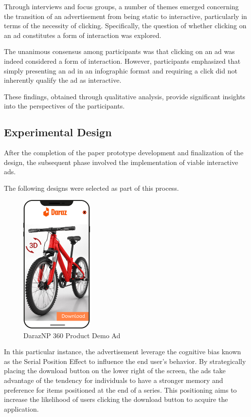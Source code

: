 \documentclass[journal]{IEEEtran}
\begin{document}
Through interviews and focus groups, a number of themes emerged concerning the transition
of an advertisement from being static to interactive, particularly in terms of the necessity
of clicking. Specifically, the question of whether clicking on an ad constitutes a form of
interaction was explored.

The unanimous consensus among participants was that clicking on an ad was indeed considered
a form of interaction. However, participants emphasized that simply presenting an ad in an
infographic format and requiring a click did not inherently qualify the ad as interactive.

These findings, obtained through qualitative analysis, provide significant insights into
the  perspectives of the participants.


\subsection{Experimental Design}
After the completion of the paper prototype development and finalization of the design,
the subsequent phase involved the implementation of viable interactive ads.

The following designs were selected as part of this process.

\begin{figure}[H]
    \centering
    \includegraphics[height=7cm]{Daraz360.png}
    \caption{DarazNP 360\textdegree{} Product Demo Ad}
\end{figure}
In this particular instance, the advertisement leverage the cognitive bias known as the
Serial Position Effect to influence the end user's behavior. By strategically placing the
download button on the lower right of the screen, the ads take advantage of the tendency
for individuals to have a stronger memory and preference for items positioned at the end
of a series. This positioning aims to increase the likelihood of users clicking the
download button to acquire the application.
\end{document}
